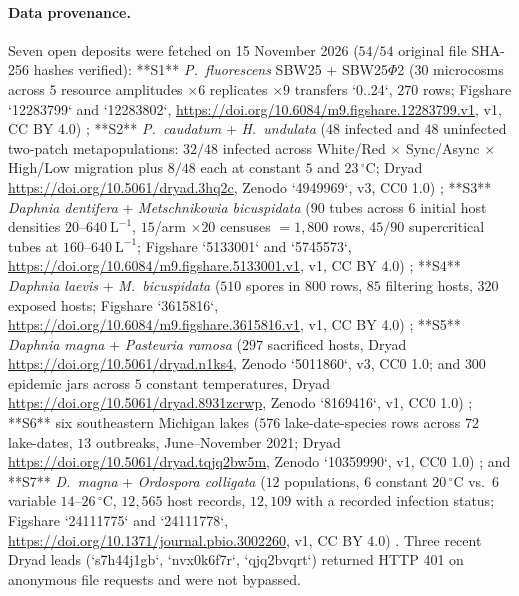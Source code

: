 \paragraph{Data provenance.}
Seven open deposits were fetched on 15 November 2026 ($54/54$ original file SHA-256 hashes verified): **S1** \textit{P.~fluorescens} SBW25 + SBW25$\Phi$2 ($30$ microcosms across $5$ resource amplitudes $\times 6$ replicates $\times 9$ transfers `0..24`, $270$ rows; Figshare `12283799` and `12283802`, \url{https://doi.org/10.6084/m9.figshare.12283799.v1}, v1, CC BY 4.0) \citep{ferris2020}; **S2** \textit{P.~caudatum} + \textit{H.~undulata} ($48$ infected and $48$ uninfected two-patch metapopulations: $32/48$ infected across White/Red $\times$ Sync/Async $\times$ High/Low migration plus $8/48$ each at constant $5$ and $23\,^{\circ}\mathrm{C}$; Dryad \url{https://doi.org/10.5061/dryad.3hq2c}, Zenodo `4949969`, v3, CC0 1.0) \citep{duncan2013}; **S3** \textit{Daphnia dentifera} + \textit{Metschnikowia bicuspidata} ($90$ tubes across $6$ initial host densities $20$--$640\ \mathrm{L}^{-1}$, $15$/arm $\times 20$ censuses $= 1{,}800$ rows, $45/90$ supercritical tubes at $160$--$640\ \mathrm{L}^{-1}$; Figshare `5133001` and `5745573`, \url{https://doi.org/10.6084/m9.figshare.5133001.v1}, v1, CC BY 4.0) \citep{dallas2018}; **S4** \textit{Daphnia laevis} + \textit{M.~bicuspidata} ($510$ spores in $800$ rows, $85$ filtering hosts, $320$ exposed hosts; Figshare `3615816`, \url{https://doi.org/10.6084/m9.figshare.3615816.v1}, v1, CC BY 4.0) \citep{dallas2016}; **S5** \textit{Daphnia magna} + \textit{Pasteuria ramosa} ($297$ sacrificed hosts, Dryad \url{https://doi.org/10.5061/dryad.n1ks4}, Zenodo `5011860`, v3, CC0 1.0; and $300$ epidemic jars across $5$ constant temperatures, Dryad \url{https://doi.org/10.5061/dryad.8931zcrwp}, Zenodo `8169416`, v1, CC0 1.0) \citep{clerc2015,tadiri2023}; **S6** six southeastern Michigan lakes ($576$ lake-date-species rows across $72$ lake-dates, $13$ outbreaks, June--November 2021; Dryad \url{https://doi.org/10.5061/dryad.tqjq2bw5m}, Zenodo `10359990`, v1, CC0 1.0) \citep{davenport2024}; and **S7** \textit{D.~magna} + \textit{Ordospora colligata} ($12$ populations, $6$ constant $20\,^{\circ}\mathrm{C}$ vs.\ $6$ variable $14$--$26\,^{\circ}\mathrm{C}$, $12{,}565$ host records, $12{,}109$ with a recorded infection status; Figshare `24111775` and `24111778`, \url{https://doi.org/10.1371/journal.pbio.3002260}, v1, CC BY 4.0) \citep{krichel2023}. Three recent Dryad leads (`s7h44j1gb`, `nvx0k6f7r`, `qjq2bvqrt`) returned HTTP 401 on anonymous file requests and were not bypassed.


